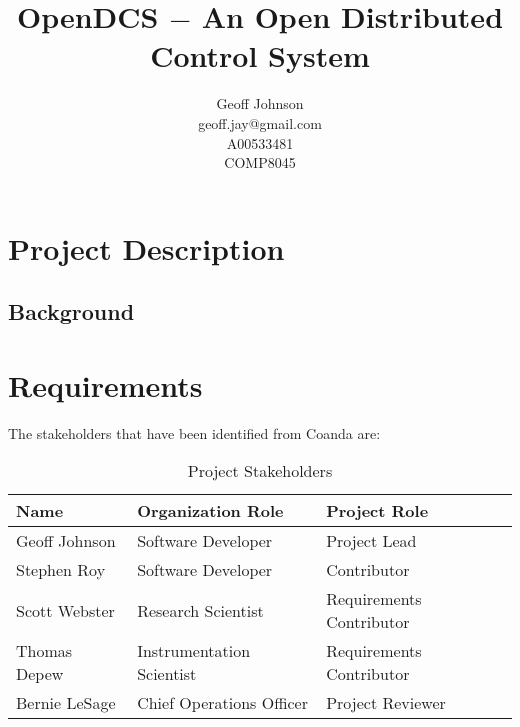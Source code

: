 \documentclass[11pt]{article}
\begin{document}
\nocite{*}

  \title{%
    OpenDCS $-$ An Open Distributed Control System\vspace{2em}
  }

  \author{%
    Geoff Johnson \vspace{0.5em} \\
    geoff.jay@gmail.com \vspace{0.5em} \\
    A00533481 \vspace{0.5em} \\
    COMP8045 \vspace{0.5em}
  }

  \maketitle
  \thispagestyle{empty}
  \newpage
  \mbox{}
  \thispagestyle{empty}

  \newpage
  \addtocounter{page}{-1}
  \tableofcontents
  \listoffigures
  \listoftables
  \lstlistoflistings

  \newpage


  \section{Project Description}\label{sec:desc}

    \subsection{Background}\label{sec:desc-bg}

  \section{Requirements}\label{sec:req}

    The stakeholders that have been identified from Coanda are:

    \begin{table}[H]
      \centering
      \begin{tabular}{l p{6cm} p{6cm}}
        \toprule
        Name & Organization Role & Project Role \\ [0.5ex]
        \midrule
        Geoff Johnson & Software Developer        & Project Lead \\
        Stephen Roy   & Software Developer        & Contributor \\
        Scott Webster & Research Scientist        & Requirements Contributor \\
        Thomas Depew  & Instrumentation Scientist & Requirements Contributor \\
        Bernie LeSage & Chief Operations Officer  & Project Reviewer \\
        \bottomrule
      \end{tabular}
      \caption{Project Stakeholders}\label{tab:stakeholders}
    \end{table}
\end{document}
